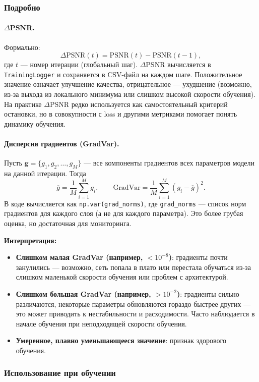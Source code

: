 \documentclass[12pt,a4paper]{article}
\begin{document}
\subsubsection{Подробно}

\paragraph{\(\Delta\)PSNR.}
Формально:
\[
\Delta\text{PSNR}(t) = \text{PSNR}(t) - \text{PSNR}(t-1),
\]
где \(t\) — номер итерации (глобальный шаг). \(\Delta\)PSNR вычисляется в \texttt{TrainingLogger} и сохраняется в CSV-файл на каждом шаге. Положительное значение означает улучшение качества, отрицательное — ухудшение (возможно, из-за выхода из локального минимума или слишком высокой скорости обучения). На практике \(\Delta\)PSNR редко используется как самостоятельный критерий остановки, но в совокупности с loss и другими метриками помогает понять динамику обучения.

\paragraph{Дисперсия градиентов (GradVar).}
Пусть \(\mathbf{g} = \{g_1, g_2, \dots, g_M\}\) — все компоненты градиентов всех параметров модели на данной итерации. Тогда
\[
\overline{g} = \frac{1}{M}\sum_{i=1}^{M} g_i, \qquad 
\text{GradVar} = \frac{1}{M}\sum_{i=1}^{M} (g_i - \overline{g})^2.
\]
В коде вычисляется как \texttt{np.var(grad\_norms)}, где \texttt{grad\_norms} — список норм градиентов для каждого слоя (а не для каждого параметра). Это более грубая оценка, но достаточная для мониторинга.

\textbf{Интерпретация:}
\begin{itemize}
    \item \textbf{Слишком малая GradVar (например, \(<10^{-8}\))}: градиенты почти занулились — возможно, сеть попала в плато или перестала обучаться из-за слишком маленькой скорости обучения или проблем с архитектурой.
    \item \textbf{Слишком большая GradVar (например, \(>10^{-2}\))}: градиенты сильно различаются, некоторые параметры обновляются гораздо быстрее других — это может приводить к нестабильности и расходимости. Часто наблюдается в начале обучения при неподходящей скорости обучения.
    \item \textbf{Умеренное, плавно уменьшающееся значение}: признак здорового обучения.
\end{itemize}

\subsubsection{Использование при обучении}
\end{document}
